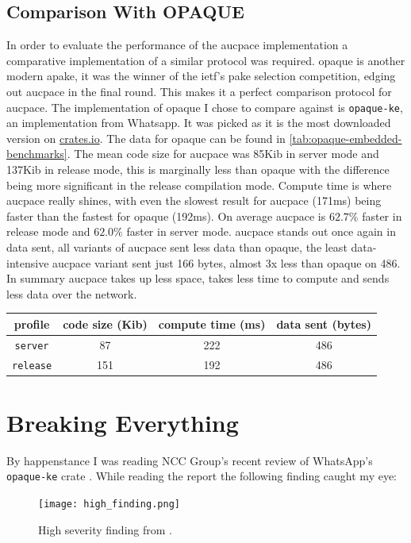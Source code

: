 \subsection{Comparison With OPAQUE}
In order to evaluate the performance of the \gls{aucpace} implementation a comparative implementation of a similar protocol was required.
\gls{opaque} is another modern \gls{apake}, it was the winner of the \gls{ietf}'s \gls{pake} selection competition, edging out \gls{aucpace} in the final round.
This makes it a perfect comparison protocol for \gls{aucpace}.
The implementation of \gls{opaque} I chose to compare against is \texttt{opaque-ke}, an implementation from Whatsapp.
It was picked as it is the most downloaded version on \href{https://crates.io/}{crates.io}.
The data for \gls{opaque} can be found in \cref{tab:opaque-embedded-benchmarks}.
The mean code size for \gls{aucpace} was 85Kib in server mode and 137Kib in release mode, this is marginally less than \gls{opaque} with the difference being more significant in the release compilation mode.
Compute time is where \gls{aucpace} really shines, with even the slowest result for \gls{aucpace} (171ms) being faster than the fastest for \gls{opaque} (192ms).
On average \gls{aucpace} is $62.7\%$ faster in release mode and $62.0\%$ faster in server mode.
\gls{aucpace} stands out once again in data sent, all variants of \gls{aucpace} sent less data than \gls{opaque}, the least data-intensive \gls{aucpace} variant sent just 166 bytes, almost 3x less than \gls{opaque} on 486.
In summary \gls{aucpace} takes up less space, takes less time to compute and sends less data over the network.

\clearpage

\begin{center}
  \label{tab:opaque-embedded-benchmarks}
  \begin{tabular}{ cccc }
    \toprule
    profile & code size (Kib) & compute time (ms) & data sent (bytes) \\
    \midrule
    \texttt{server}  & 87 & 222 & 486 \\
    \texttt{release} & 151 & 192 & 486 \\
    \bottomrule
  \end{tabular}
\end{center}

\section{Breaking Everything}
By happenstance I was reading NCC Group's recent review of WhatsApp's \texttt{opaque-ke} crate \cite{whatsapp-are-dumb-too, whatsapp-are-dumb-too-report}.
While reading the report the following finding caught my eye:
\begin{figure}[H]
  \centering

  \texttt{[image: high\_finding.png]}
  \caption{High severity finding from \cite{whatsapp-are-dumb-too-report}.}
  \label{fig:high-severity-finding}
\end{figure}

